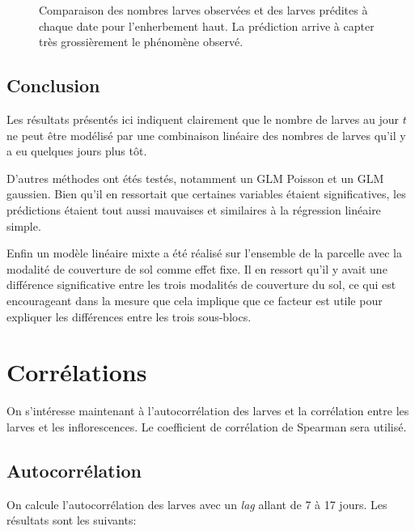 \documentclass[a4paper, 11pt]{article}
\begin{document}
\begin{figure}[ht]
 \centering
 \caption{Comparaison des nombres larves observées et des larves prédites à chaque date pour l'enherbement haut. La prédiction arrive  à capter très grossièrement le phénomène observé. }
 \label{fig:lmeh2}
\end{figure}

\clearpage
\subsection{Conclusion}

Les résultats présentés ici indiquent clairement que le nombre de larves au jour $t$ ne peut être modélisé par une combinaison linéaire des nombres de larves qu'il y a eu quelques jours plus tôt.

D'autres méthodes ont étés testés, notamment un GLM Poisson et un GLM gaussien. Bien qu'il en ressortait que certaines variables étaient significatives, les prédictions étaient tout aussi mauvaises et similaires à la régression linéaire simple.

Enfin un modèle linéaire mixte a été réalisé sur l'ensemble de la parcelle avec la modalité de couverture de sol comme effet fixe. Il en ressort qu'il y avait une différence significative entre les trois modalités de couverture du sol, ce qui est encourageant dans la mesure que cela implique que ce facteur est utile pour expliquer les différences entre les trois sous-blocs.

\section{Corrélations}

On s'intéresse maintenant à l'autocorrélation des larves et la corrélation entre les larves et les inflorescences. Le coefficient de corrélation de Spearman sera utilisé.

\subsection{Autocorrélation}

On calcule l'autocorrélation des larves avec un \emph{lag} allant de 7 à 17 jours. Les résultats sont les suivants:
\end{document}
